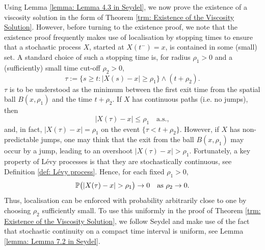 Using Lemma \ref{lemma: Lemma 4.3 in Seydel}, we now prove the existence of a viscosity solution in the form of Theorem \ref{trm: Existence of the Viscosity Solution}. However, before turning to the existence proof, we note that the existence proof frequently makes use of localisation by stopping times to ensure that a stochastic process $X$, started at $X(t^-)=x$, is contained in some (small) set. A standard choice of such a stopping time is, for radius $\rho_1>0$ and a (sufficiently) small time cut-off  $\rho_2>0$,
\begin{equation*}
    \tau := \{s \geq t: |X(s)-x| \geq \rho_1 \} \wedge (t+\rho_2).
\end{equation*}
$\tau$ is to be understood as the minimum between the first exit time from the spatial ball $B(x,\rho_1)$ and the time $t+\rho_2$. If $X$ has continuous paths (i.e. no jumps), then
\begin{equation*}
    |X(\tau) - x| \leq \rho_1 \quad \text{a.s.},
\end{equation*}
and, in fact, $|X(\tau)-x| = \rho_1$ on the event $\{\tau < t + \rho_2\}$. However, if $X$ has non-predictable jumps, one may think that the exit from the ball $B(x,\rho_1)$ may occur by a jump, leading to an overshoot $|X(\tau)-x|>\rho_1$. Fortunately, a key property of Lévy processes is that they are stochastically continuous, see Definition \ref{def: Lévy process}. Hence, for each fixed $\rho_1>0$, 
\begin{equation*}
    \Prob \big( |X(\tau)-x|> \rho_1 \big) \rightarrow 0 \quad \text{as } \rho_2 \rightarrow 0.
\end{equation*}
Thus, localisation can be enforced with probability arbitrarily close to one by choosing $\rho_2$ sufficiently small. To use this uniformly in the proof of Theorem \ref{trm: Existence of the Viscosity Solution}, we follow Seydel \cite{seydel2010generalexistenceuniquenessviscosity} and make use of the fact that stochastic continuity on a compact time interval is uniform, see Lemma \ref{lemma: Lemma 7.2 in Seydel}.

